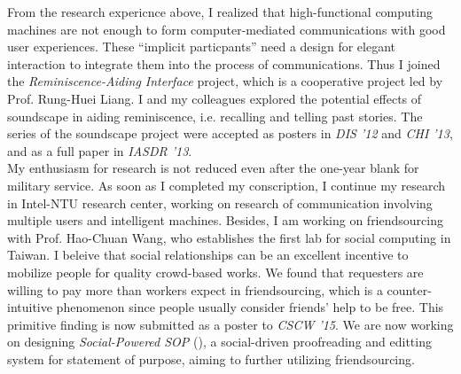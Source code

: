\noindent
From the research expericnce above, 
I realized that high-functional computing machines are not enough to form computer-mediated communications with good user experiences.
These ``implicit particpants'' need a design for elegant interaction to integrate them into the process of communications.
Thus I joined the \textit{Reminiscence-Aiding Interface} project, which is a cooperative project led by Prof. Rung-Huei Liang.
I and my colleagues explored the potential effects of soundscape in aiding reminiscence, i.e. recalling and telling past stories.
The series of the soundscape project were accepted as posters in \textit{DIS '12} and \textit{CHI '13}, 
and as a full paper in \textit{IASDR '13}.\\


\noindent
My enthusiasm for research is not reduced even after the one-year blank for military service.
As soon as I completed my conscription, I continue my research in Intel-NTU research center,
working on research of communication involving multiple users and intelligent machines.
Besides, I am working on friendsourcing with Prof. Hao-Chuan Wang, who establishes the first lab for social computing in Taiwan.
I beleive that social relationships can be an excellent incentive to mobilize people for quality crowd-based works.
We found that requesters are willing to pay more than workers expect in friendsourcing,
which is a counter-intuitive phenomenon since people usually consider friends' help to be free.
This primitive finding is now submitted as a poster to \textit{CSCW '15}.
We are now working on designing \textit{Social-Powered SOP} (),
a social-driven proofreading and editting system for statement of purpose, aiming to further utilizing friendsourcing. \\




